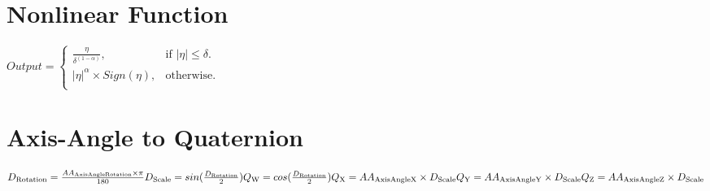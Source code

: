 \documentclass{article}
\begin{document}
\section{Nonlinear Function}
$
 Output = \begin{cases}
   \frac{ \eta } { \delta^{(1 - \alpha)} }, & \text{if $|\eta| \le \delta$}.\\
   |\eta|^{\alpha} \times Sign(\eta), & \text{otherwise}.\\
\end{cases}
$


\section{Axis-Angle to Quaternion}
$
D_\textrm{Rotation} = \frac{ AA_\textrm{AxisAngleRotation} \times \pi} {180}\\
\newline
D_\textrm{Scale} = sin( \frac{D_\textrm{Rotation}} {2} )\\
\newline
Q_\textrm{W} = cos( \frac{D_\textrm{Rotation}} {2} )\\
Q_\textrm{X} = AA_\textrm{AxisAngleX} \times D_\textrm{Scale}\\
Q_\textrm{Y} = AA_\textrm{AxisAngleY} \times D_\textrm{Scale}\\
Q_\textrm{Z} = AA_\textrm{AxisAngleZ} \times D_\textrm{Scale}\\
\newline
\newline
\newline
\newline
\newline
\newline
\newline
$
\end{document}
